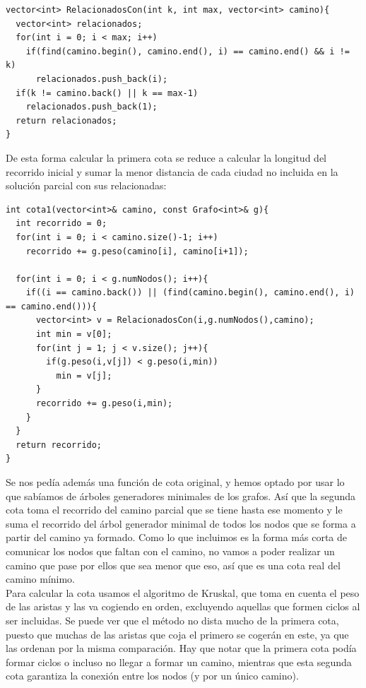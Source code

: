 \begin{lstlisting}
vector<int> RelacionadosCon(int k, int max, vector<int> camino){
  vector<int> relacionados;
  for(int i = 0; i < max; i++)
    if(find(camino.begin(), camino.end(), i) == camino.end() && i != k)
      relacionados.push_back(i);
  if(k != camino.back() || k == max-1)
    relacionados.push_back(1);
  return relacionados;
}
\end{lstlisting}

De esta forma calcular la primera cota se reduce a calcular la longitud del recorrido inicial y sumar la menor distancia de cada ciudad no incluida en la solución parcial con sus relacionadas:

\begin{lstlisting}
int cota1(vector<int>& camino, const Grafo<int>& g){
  int recorrido = 0;
  for(int i = 0; i < camino.size()-1; i++)
    recorrido += g.peso(camino[i], camino[i+1]);

  for(int i = 0; i < g.numNodos(); i++){
    if((i == camino.back()) || (find(camino.begin(), camino.end(), i) == camino.end())){
      vector<int> v = RelacionadosCon(i,g.numNodos(),camino);
      int min = v[0];
      for(int j = 1; j < v.size(); j++){
        if(g.peso(i,v[j]) < g.peso(i,min))
          min = v[j];
      }
      recorrido += g.peso(i,min);
    }
  }
  return recorrido;
}
\end{lstlisting}

Se nos pedía además una función de cota original, y hemos optado por usar lo que sabíamos de árboles generadores minimales de los grafos. Así que la segunda cota toma el recorrido del camino parcial que se tiene hasta ese momento y le suma el recorrido del árbol generador minimal de todos los nodos que se forma a partir del camino ya formado. Como lo que incluimos es la forma más corta de comunicar los nodos que faltan con el camino, no vamos a poder realizar un camino que pase por ellos que sea menor que eso, así que es una cota real del camino mínimo. \\

Para calcular la cota usamos el algoritmo de Kruskal, que toma en cuenta el peso de las aristas y las va cogiendo en orden, excluyendo aquellas que formen ciclos al ser incluidas. Se puede ver que el método no dista mucho de la primera cota, puesto que muchas de las aristas que coja el primero se cogerán en este, ya que las ordenan por la misma comparación. Hay que notar que la primera cota podía formar ciclos o incluso no llegar a formar un camino, mientras que esta segunda cota garantiza la conexión entre los nodos (y por un único camino). \\

